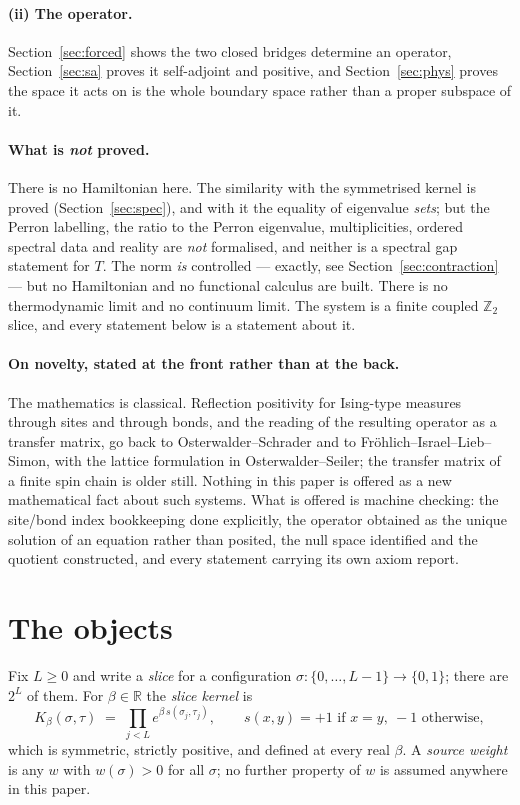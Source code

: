 \documentclass[11pt]{article}
\theoremstyle{definition}
\newcommand{\R}{\mathbb{R}}
\newcommand{\Z}{\mathbb{Z}}
\begin{document}
\paragraph{(ii) The operator.}  Section~\ref{sec:forced} shows the two closed
bridges determine an operator, Section~\ref{sec:sa} proves it self-adjoint and
positive, and Section~\ref{sec:phys} proves the space it acts on is the whole
boundary space rather than a proper subspace of it.

\paragraph{What is \emph{not} proved.}  There is no Hamiltonian here.  The
similarity with the symmetrised kernel is proved (Section~\ref{sec:spec}), and
with it the equality of eigenvalue \emph{sets}; but the Perron labelling, the
ratio to the Perron eigenvalue, multiplicities, ordered spectral data and
reality are \emph{not} formalised, and neither is a spectral gap statement for
$T$.  The norm \emph{is} controlled --- exactly, see
Section~\ref{sec:contraction} --- but no Hamiltonian and no functional calculus
are built.  There is no thermodynamic limit and no continuum limit.  The system
is a finite coupled $\Z_2$ slice, and every statement below is a statement about
it.

\paragraph{On novelty, stated at the front rather than at the back.}  The
mathematics is classical.  Reflection positivity for Ising-type measures through
sites and through bonds, and the reading of the resulting operator as a transfer
matrix, go back to Osterwalder--Schrader and to
Fr\"ohlich--Israel--Lieb--Simon, with the lattice formulation in
Osterwalder--Seiler; the transfer matrix of a finite spin chain is older still.
Nothing in this paper is offered as a new mathematical fact about such systems.
What is offered is machine checking: the site/bond index bookkeeping done
explicitly, the operator obtained as the unique solution of an equation rather
than posited, the null space identified and the quotient constructed, and every
statement carrying its own axiom report.

\section{The objects}\label{sec:objects}

Fix $L\ge0$ and write a \emph{slice} for a configuration
$\sigma:\{0,\dots,L-1\}\to\{0,1\}$; there are $2^L$ of them.  For $\beta\in\R$
the \emph{slice kernel} is
\[
  K_\beta(\sigma,\tau)\;=\;\prod_{j<L}e^{\beta\,s(\sigma_j,\tau_j)},
  \qquad s(x,y)=+1 \text{ if } x=y,\ -1 \text{ otherwise},
\]
which is symmetric, strictly positive, and defined at every real $\beta$.  A
\emph{source weight} is any $w$ with $w(\sigma)>0$ for all $\sigma$; no further
property of $w$ is assumed anywhere in this paper.
\end{document}
